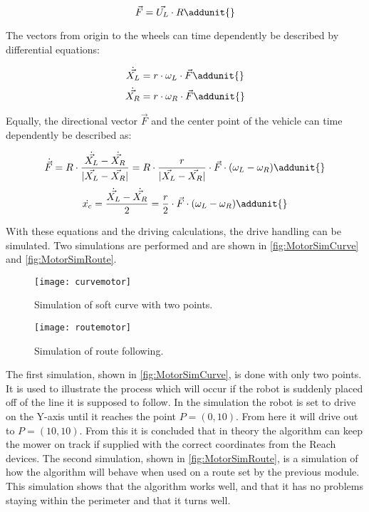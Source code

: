 \begin{equation}	
\vec{F}=\vec{U_L} \cdot R \addunit{}
\label{eq:directionVect}
\end{equation}

The vectors from origin to the wheels can time dependently be described by differential equations:

\begin{equation}
\dot{\vec{X_L}} = r \cdot \omega_L \cdot \vec{F} \addunit{} 
\label{eq:vect2wheelL}
\end{equation}
\begin{equation}
\dot{\vec{X_R}} = r \cdot \omega_R \cdot \vec{F} \addunit{} 
\label{eq:vect2wheelR}
\end{equation}
\startexplain
\stopexplain

Equally, the directional vector $\vec{F}$ and the center point of the vehicle can time dependently be described as:

\begin{equation}
\dot{\vec{F}} 
= R \cdot \frac{\dot{\vec{X_L}} - \dot{\vec{X_R}}}{|\vec{X_L} - \vec{X_R}|}
= R \cdot \frac{r}{|\vec{X_L} - \vec{X_R}|} \cdot \vec{F} \cdot (\omega_L - \omega_R)
 \addunit{} 
\end{equation}
\begin{equation}
\dot{x_c} 
= \frac{\dot{\vec{X_L}} - \dot{\vec{X_R}}}{2} 
= \frac{r}{2} \cdot \vec{F} \cdot (\omega_L - \omega_R) \addunit{} 
\end{equation}

With these equations and the driving calculations, the drive handling can be simulated. Two simulations are performed and are shown in \autoref{fig:MotorSimCurve} and \autoref{fig:MotorSimRoute}.

\begin{figure}[h!]
    \centering
        \texttt{[image: curvemotor]}
        \caption{Simulation of soft curve with two points.}
        \label{fig:MotorSimCurve} 
\end{figure}
\begin{figure}[h!]
  \centering
         \texttt{[image: routemotor]}
        \caption{Simulation of route following.}
        \label{fig:MotorSimRoute}
\end{figure}

The first simulation, shown in \autoref{fig:MotorSimCurve}, is done with only two points. It is used to illustrate the process which will occur if the robot is suddenly placed off of the line it is supposed to follow. In the simulation the robot is set to drive on the Y-axis until it reaches the point $P=(0,10)$. From here it will drive out to $P=(10,10)$. From this it is concluded that in theory the algorithm can keep the mower on track if supplied with the correct coordinates from the Reach devices. The second simulation, shown in \autoref{fig:MotorSimRoute}, is a simulation of how the algorithm will behave when used on a route set by the previous module. This simulation shows that the algorithm works well, and that it has no problems staying within the perimeter and that it turns well. 